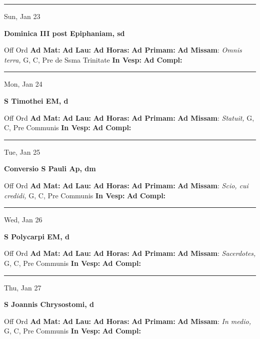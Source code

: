 \documentclass[letterpaper, 10pt]{article}
\begin{document}
\hrule
\begin{center}
Sun, Jan 23
\end{center}\textbf{ \large Dominica III post Epiphaniam, \textnormal{\normalsize sd}}
\begin{justify}
Off Ord
\textbf{Ad Mat: }
\textbf{Ad Lau: }
\textbf{Ad Horas: }
\textbf{Ad Primam: }
\textbf{Ad Missam}: \textit{Omnis terra,} G, C, Pre de Ssma Trinitate
\textbf{In Vesp: }
\textbf{Ad Compl: }\end{justify}



\hrule
\begin{center}
Mon, Jan 24
\end{center}\textbf{ \large S Timothei EM, \textnormal{\normalsize d}}
\begin{justify}
Off Ord
\textbf{Ad Mat: }
\textbf{Ad Lau: }
\textbf{Ad Horas: }
\textbf{Ad Primam: }
\textbf{Ad Missam}: \textit{Statuit,} G, C, Pre Communis
\textbf{In Vesp: }
\textbf{Ad Compl: }\end{justify}



\hrule
\begin{center}
Tue, Jan 25
\end{center}\textbf{ \large Conversio S Pauli Ap, \textnormal{\normalsize dm}}
\begin{justify}
Off Ord
\textbf{Ad Mat: }
\textbf{Ad Lau: }
\textbf{Ad Horas: }
\textbf{Ad Primam: }
\textbf{Ad Missam}: \textit{Scio, cui credidi,} G, C, Pre Communis
\textbf{In Vesp: }
\textbf{Ad Compl: }\end{justify}



\hrule
\begin{center}
Wed, Jan 26
\end{center}\textbf{ \large S Polycarpi EM, \textnormal{\normalsize d}}
\begin{justify}
Off Ord
\textbf{Ad Mat: }
\textbf{Ad Lau: }
\textbf{Ad Horas: }
\textbf{Ad Primam: }
\textbf{Ad Missam}: \textit{Sacerdotes,} G, C, Pre Communis
\textbf{In Vesp: }
\textbf{Ad Compl: }\end{justify}



\hrule
\begin{center}
Thu, Jan 27
\end{center}\textbf{ \large S Joannis Chrysostomi, \textnormal{\normalsize d}}
\begin{justify}
Off Ord
\textbf{Ad Mat: }
\textbf{Ad Lau: }
\textbf{Ad Horas: }
\textbf{Ad Primam: }
\textbf{Ad Missam}: \textit{In medio,} G, C, Pre Communis
\textbf{In Vesp: }
\textbf{Ad Compl: }\end{justify}
\end{document}
